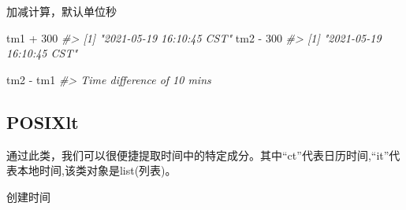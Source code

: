 \documentclass[
]{book}
\newenvironment{Shaded}{\begin{snugshade}}{\end{snugshade}}
\newcommand{\CommentTok}[1]{\textcolor[rgb]{0.56,0.35,0.01}{\textit{#1}}}
\newcommand{\DecValTok}[1]{\textcolor[rgb]{0.00,0.00,0.81}{#1}}
\newcommand{\FunctionTok}[1]{\textcolor[rgb]{0.00,0.00,0.00}{#1}}
\newcommand{\NormalTok}[1]{#1}
\newcommand{\OtherTok}[1]{\textcolor[rgb]{0.56,0.35,0.01}{#1}}
\newcommand{\SpecialCharTok}[1]{\textcolor[rgb]{0.00,0.00,0.00}{#1}}
\newcommand{\StringTok}[1]{\textcolor[rgb]{0.31,0.60,0.02}{#1}}
\begin{document}
加减计算，默认单位秒

\begin{Shaded}
\begin{Highlighting}[]
\NormalTok{tm1 }\SpecialCharTok{+} \DecValTok{300}
\CommentTok{\#\textgreater{} [1] "2021{-}05{-}19 16:10:45 CST"}
\NormalTok{tm2 }\SpecialCharTok{{-}} \DecValTok{300}
\CommentTok{\#\textgreater{} [1] "2021{-}05{-}19 16:10:45 CST"}
\end{Highlighting}
\end{Shaded}

\begin{Shaded}
\begin{Highlighting}[]
\NormalTok{tm2 }\SpecialCharTok{{-}}\NormalTok{ tm1}
\CommentTok{\#\textgreater{} Time difference of 10 mins}
\end{Highlighting}
\end{Shaded}

\hypertarget{the-POSIXlt-class}{%
\subsection{POSIXlt}\label{the-POSIXlt-class}}

通过此类，我们可以很便捷提取时间中的特定成分。其中``ct''代表日历时间,``it''代表本地时间,该类对象是list(列表)。

创建时间

\begin{Shaded}
\end{Shaded}
\end{document}
